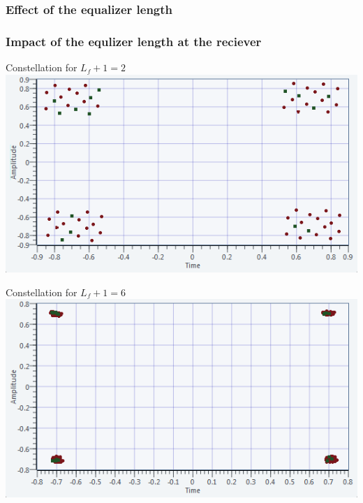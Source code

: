 \documentclass[11pt]{beamer}
\begin{document}
\subsubsection{Effect of the equalizer length}
\begin{frame}
\frametitle{Impact of the equlizer length at the reciever}
\begin{minipage}[c]{0.46\linewidth}
\centering 
{Constellation for $L_f + 1 = 2$}
\includegraphics[width=\textwidth]{img/ISI-2}
\end{minipage}
\begin{minipage}[c]{0.46\linewidth}
\centering 
{Constellation for $L_f + 1 = 6$}
\includegraphics[width=\textwidth]{img/ISI-6}
\end{minipage}
\end{frame}
\end{document}
